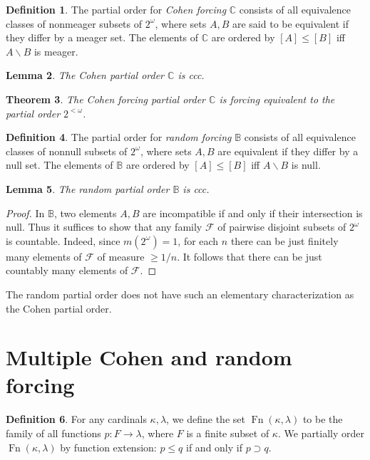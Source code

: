 \documentclass[11pt,oneside]{amsbook}
\DeclareMathOperator{\Fn}{Fn}
\theoremstyle{definition}
\theoremstyle{plain}
\newtheorem{thm}{Theorem}[section]
\newtheorem{lem}[thm]{Lemma}
\theoremstyle{definition}
\newtheorem{defn}[thm]{Definition}
\theoremstyle{remark}
\begin{document}
\begin{defn}
  The partial order for \emph{Cohen forcing} $\mathbb C$ consists of all equivalence classes of nonmeager subsets of $2^\omega$, where sets $A,B$ are said to be equivalent if they differ by a meager set. The elements of $\mathbb C$ are ordered by $[A]\leq[B]$ iff $A\smallsetminus B$ is meager.
\end{defn}

\begin{lem}
  The Cohen partial order $\mathbb C$ is ccc.
\end{lem}

\begin{thm}
  The Cohen forcing partial order $\mathbb C$ is forcing equivalent to the partial order $2^{<\omega}$.
\end{thm}

\begin{defn}
  The partial order for \emph{random forcing} $\mathbb B$ consists of all equivalence classes of nonnull subsets of $2^\omega$, where sets $A,B$ are equivalent if they differ by a null set. The elements of $\mathbb B$ are ordered by $[A]\leq[B]$ iff $A\smallsetminus B$ is null.
\end{defn}

\begin{lem}
  The random partial order $\mathbb B$ is ccc.
\end{lem}

\begin{proof}
  In $\mathbb B$, two elements $A,B$ are incompatible if and only if their intersection is null. Thus it suffices to show that any family $\mathcal F$ of pairwise disjoint subsets of $2^\omega$ is countable. Indeed, since $m(2^\omega)=1$, for each $n$ there can be just finitely many elements of $\mathcal F$ of measure $\geq1/n$. It follows that there can be just countably many elements of $\mathcal F$.
\end{proof}

The random partial order does not have such an elementary characterization as the Cohen partial order.


\section{Multiple Cohen and random forcing}

\begin{defn}
  For any cardinals $\kappa,\lambda$, we define the set $\Fn(\kappa,\lambda)$ to be the family of all functions $p\colon F\to\lambda$, where $F$ is a finite subset of $\kappa$. We partially order $\Fn(\kappa,\lambda)$ by function extension: $p\leq q$ if and only if $p\supset q$.
\end{defn}
\end{document}

